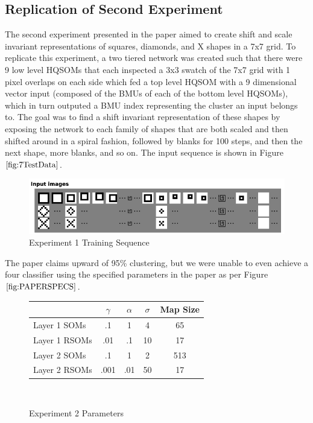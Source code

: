 \documentclass[a4paper,10pt]{article}
\begin{document}
\subsection{Replication of Second Experiment}
The second experiment presented in the paper aimed to create shift and scale invariant
representations of squares, diamonds, and X shapes in a 7x7 grid.  To replicate this experiment, a
two tiered network was created such that there were 9 low level HQSOMs that each inspected a 3x3
swatch of the 7x7 grid with 1 pixel overlaps on each side which fed a top level HQSOM with a 9
dimensional vector input (composed of the BMUs of each of the bottom level HQSOMs), which in turn
outputed a BMU index representing the cluster an input belongs to. The goal was to find a shift
invariant representation of these shapes by exposing the network to each family of shapes that
are both scaled and then shifted around in a spiral fashion, followed by blanks for 100 steps,
and then the next shape, more blanks, and so on.  The input sequence is shown in Figure
$\ref{fig:7TestData}$.
\begin{figure}
\begin{center}
 \includegraphics[scale=.3]{./exp2_dataset.png}
\end{center}
\caption{Experiment 1 Training Sequence}
\label{fig:7TestData}
\end{figure} 

The paper claims upward of 95\% clustering, but we were unable to even achieve a four
classifier using the specified parameters in the paper as per Figure $\ref{fig:PAPERSPECS}$. 
\begin{figure}[ht] 
 \begin{center}
  \begin{tabular}{ | l | c | c | c | c | }
    \hline
    & $\gamma$ & $\alpha$ & $\sigma$ & Map Size\\ \hline
    Layer 1 SOMs  & .1   & 1   & 4  & 65\\ \hline
    Layer 1 RSOMs & .01  & .1  & 10 & 17\\ \hline
    Layer 2 SOMs  & .1   & 1   & 2  & 513\\ \hline
    Layer 2 RSOMs &  .001 & .01 & 50 & 17 \\
    \hline
  \end{tabular}
\caption{Experiment 2 Parameters}
\label{fig:PAPERSPECS}
\end{center}
\
\end{figure}
\end{document}
